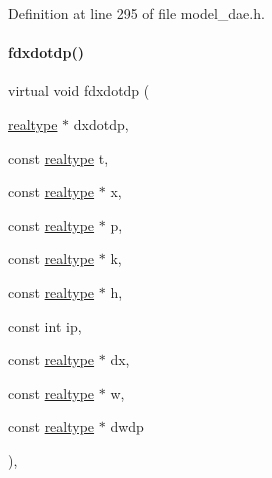 Definition at line 295 of file model\+\_\+dae.\+h.

\mbox{\label{classamici_1_1_model___d_a_e_a772b6fc2bd362707fe547466f0462278}} 
\paragraph{\texorpdfstring{fdxdotdp()}{fdxdotdp()}\hspace{0.1cm}{\footnotesize\ttfamily [3/3]}}
{\footnotesize\ttfamily virtual void fdxdotdp (\begin{DoxyParamCaption}\item[{\mbox{\hyperlink{namespaceamici_a1bdce28051d6a53868f7ccbf5f2c14a3}{realtype}} $\ast$}]{dxdotdp,  }\item[{const \mbox{\hyperlink{namespaceamici_a1bdce28051d6a53868f7ccbf5f2c14a3}{realtype}}}]{t,  }\item[{const \mbox{\hyperlink{namespaceamici_a1bdce28051d6a53868f7ccbf5f2c14a3}{realtype}} $\ast$}]{x,  }\item[{const \mbox{\hyperlink{namespaceamici_a1bdce28051d6a53868f7ccbf5f2c14a3}{realtype}} $\ast$}]{p,  }\item[{const \mbox{\hyperlink{namespaceamici_a1bdce28051d6a53868f7ccbf5f2c14a3}{realtype}} $\ast$}]{k,  }\item[{const \mbox{\hyperlink{namespaceamici_a1bdce28051d6a53868f7ccbf5f2c14a3}{realtype}} $\ast$}]{h,  }\item[{const int}]{ip,  }\item[{const \mbox{\hyperlink{namespaceamici_a1bdce28051d6a53868f7ccbf5f2c14a3}{realtype}} $\ast$}]{dx,  }\item[{const \mbox{\hyperlink{namespaceamici_a1bdce28051d6a53868f7ccbf5f2c14a3}{realtype}} $\ast$}]{w,  }\item[{const \mbox{\hyperlink{namespaceamici_a1bdce28051d6a53868f7ccbf5f2c14a3}{realtype}} $\ast$}]{dwdp }\end{DoxyParamCaption})\hspace{0.3cm}{\ttfamily [protected]}, {\ttfamily [virtual]}}


